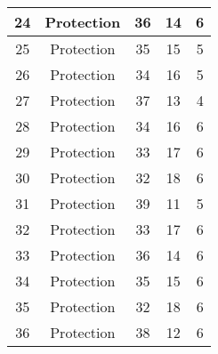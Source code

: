 \documentclass[results.tex]{subfiles}
\begin{document}
\begin{center}
\begin{tabular}{| c || c | c | c | c |}
            \hline
            24                      & Protection                   & 36                     & 14                      & 6                    \\
            \hline
            25                      & Protection                   & 35                     & 15                      & 5                    \\
            \hline
            26                      & Protection                   & 34                     & 16                      & 5                    \\
            \hline
            27                      & Protection                   & 37                     & 13                      & 4                    \\
            \hline
            28                      & Protection                   & 34                     & 16                      & 6                    \\
            \hline
            29                      & Protection                   & 33                     & 17                      & 6                    \\
            \hline
            30                      & Protection                   & 32                     & 18                      & 6                    \\
            \hline
            31                      & Protection                   & 39                     & 11                      & 5                    \\
            \hline
            32                      & Protection                   & 33                     & 17                      & 6                    \\
            \hline
            33                      & Protection                   & 36                     & 14                      & 6                    \\
            \hline
            34                      & Protection                   & 35                     & 15                      & 6                    \\
            \hline
            35                      & Protection                   & 32                     & 18                      & 6                    \\
            \hline
            36                      & Protection                   & 38                     & 12                      & 6                    \\

\end{tabular}
\end{center}
\end{document}
